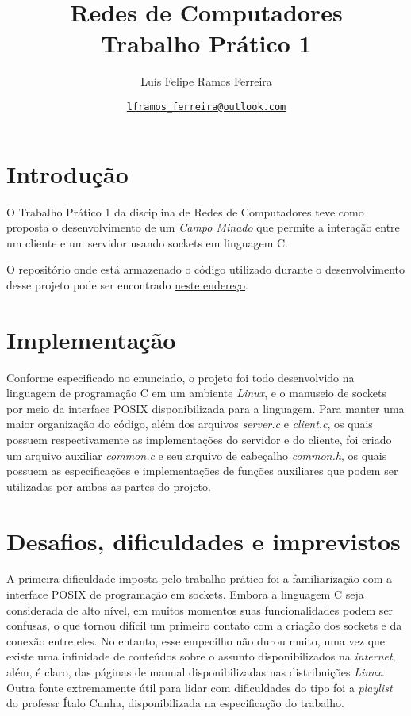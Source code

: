 \documentclass{article}
\title{Redes de Computadores \\ \large Trabalho Prático 1}
\author{Luís Felipe Ramos Ferreira}
\date{\href{mailto:lframos\_ferreira@outlook.com}{\texttt{lframos\_ferreira@outlook.com}}
}
\begin{document}
\maketitle

\section{Introdução}

O Trabalho Prático 1 da disciplina de Redes de Computadores teve como proposta
o desenvolvimento de um \textit{Campo Minado} que permite a interação entre um
cliente e um servidor usando sockets em linguagem C.

O repositório onde está armazenado o código utilizado durante o desenvolvimento
desse projeto
pode ser encontrado \href{https://github.com/lframosferreira/tp1-redes}{neste
      endereço}.

\section{Implementação}

Conforme especificado no enunciado, o projeto foi todo desenvolvido na
linguagem de programação C em um ambiente \textit{Linux}, e o manuseio de
sockets por
meio da interface POSIX
disponibilizada para a linguagem. Para manter uma maior organização do código,
além dos arquivos \textit{server.c} e \textit{client.c}, os quais possuem
respectivamente as implementações do servidor e do cliente,
foi criado um arquivo auxiliar \textit{common.c} e seu arquivo de cabeçalho
\textit{common.h}, os quais possuem as especificações e implementações de
funções auxiliares que podem ser utilizadas por ambas as partes do projeto.

\section{Desafios, dificuldades e imprevistos}

A primeira dificuldade imposta pelo trabalho prático foi a familiarização com a
interface POSIX de programação em sockets. Embora a linguagem C seja
considerada de alto nível, em muitos momentos suas funcionalidades podem ser
confusas, o que tornou difícil um primeiro contato com a criação dos sockets e
da conexão entre eles. No entanto, esse empecilho não durou muito, uma vez que
existe uma infinidade de conteúdos sobre o assunto disponibilizados na
\textit{internet}, além, é
claro, das páginas de manual disponibilizadas nas distribuições \textit{Linux}.
Outra fonte extremamente útil para lidar com dificuldades do tipo foi a
\textit{playlist} do professr Ítalo Cunha, disponibilizada na especificação do
trabalho.
\end{document}
